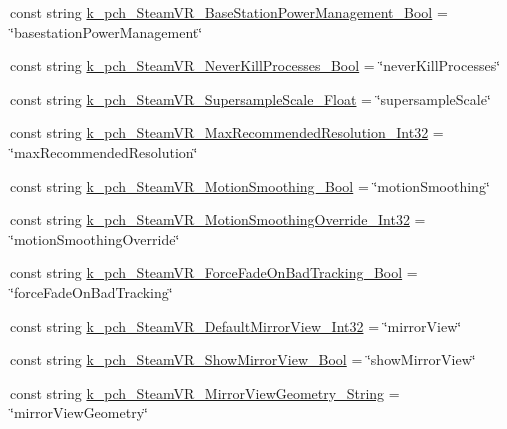 \begin{DoxyCompactItemize}
\item 
const string \mbox{\hyperlink{class_valve_1_1_v_r_1_1_open_v_r_aa35b3db60fbaeec2df2260230981fa7a}{k\+\_\+pch\+\_\+\+Steam\+V\+R\+\_\+\+Base\+Station\+Power\+Management\+\_\+\+Bool}} = \char`\"{}basestation\+Power\+Management\char`\"{}
\item 
const string \mbox{\hyperlink{class_valve_1_1_v_r_1_1_open_v_r_a7e00b4afa0453b55fa079d8f67741d33}{k\+\_\+pch\+\_\+\+Steam\+V\+R\+\_\+\+Never\+Kill\+Processes\+\_\+\+Bool}} = \char`\"{}never\+Kill\+Processes\char`\"{}
\item 
const string \mbox{\hyperlink{class_valve_1_1_v_r_1_1_open_v_r_a5f2ad57851b44591716f587dc96f177a}{k\+\_\+pch\+\_\+\+Steam\+V\+R\+\_\+\+Supersample\+Scale\+\_\+\+Float}} = \char`\"{}supersample\+Scale\char`\"{}
\item 
const string \mbox{\hyperlink{class_valve_1_1_v_r_1_1_open_v_r_ab042d55f6ede238c8690246ec091d34f}{k\+\_\+pch\+\_\+\+Steam\+V\+R\+\_\+\+Max\+Recommended\+Resolution\+\_\+\+Int32}} = \char`\"{}max\+Recommended\+Resolution\char`\"{}
\item 
const string \mbox{\hyperlink{class_valve_1_1_v_r_1_1_open_v_r_a6451c3909c435d3342db988862a9674a}{k\+\_\+pch\+\_\+\+Steam\+V\+R\+\_\+\+Motion\+Smoothing\+\_\+\+Bool}} = \char`\"{}motion\+Smoothing\char`\"{}
\item 
const string \mbox{\hyperlink{class_valve_1_1_v_r_1_1_open_v_r_ad693e90763138f4e8bfb1087478f7263}{k\+\_\+pch\+\_\+\+Steam\+V\+R\+\_\+\+Motion\+Smoothing\+Override\+\_\+\+Int32}} = \char`\"{}motion\+Smoothing\+Override\char`\"{}
\item 
const string \mbox{\hyperlink{class_valve_1_1_v_r_1_1_open_v_r_a5a6e3cef9467c8529f6fdbbb640fe5d7}{k\+\_\+pch\+\_\+\+Steam\+V\+R\+\_\+\+Force\+Fade\+On\+Bad\+Tracking\+\_\+\+Bool}} = \char`\"{}force\+Fade\+On\+Bad\+Tracking\char`\"{}
\item 
const string \mbox{\hyperlink{class_valve_1_1_v_r_1_1_open_v_r_ac988545e18a7ea0fca04665472563d19}{k\+\_\+pch\+\_\+\+Steam\+V\+R\+\_\+\+Default\+Mirror\+View\+\_\+\+Int32}} = \char`\"{}mirror\+View\char`\"{}
\item 
const string \mbox{\hyperlink{class_valve_1_1_v_r_1_1_open_v_r_a6998f00917cde2cde9c2cd17b92d9bcd}{k\+\_\+pch\+\_\+\+Steam\+V\+R\+\_\+\+Show\+Mirror\+View\+\_\+\+Bool}} = \char`\"{}show\+Mirror\+View\char`\"{}
\item 
const string \mbox{\hyperlink{class_valve_1_1_v_r_1_1_open_v_r_adae998b478a65231700cdbfc8064a4ff}{k\+\_\+pch\+\_\+\+Steam\+V\+R\+\_\+\+Mirror\+View\+Geometry\+\_\+\+String}} = \char`\"{}mirror\+View\+Geometry\char`\"{}

\end{DoxyCompactItemize}
